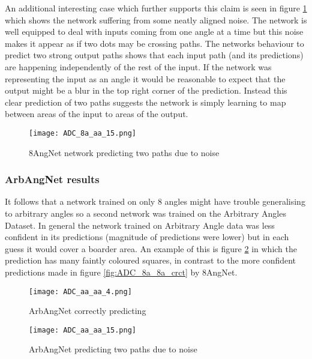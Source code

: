An additional interesting case which further supports this claim is seen in figure \ref{fig:ADC_8aNoaa_special} which shows the network suffering from some neatly aligned noise. 
The network is well equipped to deal with inputs coming from one angle at a time but this noise makes it appear as if two dots may be crossing paths. 
The networks behaviour to predict two strong output paths shows that each input path (and its predictions) are happening independently of the rest of the input.
If the network was representing the input as an angle it would be reasonable to expect that the output might be a blur in the top right corner of the prediction.  
Instead this clear prediction of two paths suggests the network is simply learning to map between areas of the input to areas of the output. 

\begin{figure}
    \centering
    \texttt{[image: ADC\_8a\_aa\_15.png]}
    \caption{8AngNet network predicting two paths due to noise}
    \label{fig:ADC_8aNoaa_special}
\end{figure}


\subsubsection{ArbAngNet results}
It follows that a network trained on only 8 angles might have trouble generalising to arbitrary angles so a second network was trained on the Arbitrary Angles Dataset. 
In general the network trained on Arbitrary Angle data was less confident in its predictions (magnitude of predictions were lower) but in each guess it would cover a boarder area. 
An example of this is figure \ref{fig:ADC_aaaa_crct} in which the prediction has many faintly coloured squares, in contrast to the more confident predictions made in figure \ref{fig:ADC_8a_8a_crct} by 8AngNet.

\begin{figure}[h]
    \centering
    \texttt{[image: ADC\_aa\_aa\_4.png]}
    \caption{ArbAngNet correctly predicting}
    \label{fig:ADC_aaaa_crct}
\end{figure}


\begin{figure}[h]
    \centering
    \texttt{[image: ADC\_aa\_aa\_15.png]}
    \caption{ArbAngNet predicting two paths due to noise}
    \label{fig:ADC_aaaa_twopath}
\end{figure}

